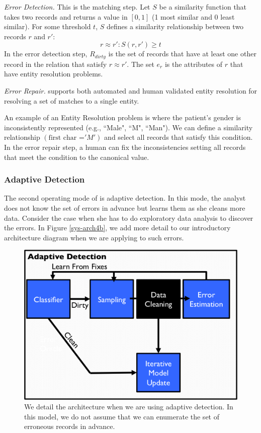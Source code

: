\vspace{0.5em}

\emph{Error Detection. } This is the matching step. Let $S$ be a similarity function that takes two records and returns a value in $[0,1]$ (1 most similar and 0 least similar). For some threshold $t$, $S$ defines a similarity relationship between two records $r$ and $r'$:
\[
r \approx r' : S(r,r') \ge t
\] 
In the error detection step, $R_{dirty}$ is the set of records that have at least one other record in the relation that satisfy $r \approx r'$.
The set $e_r$ is the attributes of $r$ that have entity resolution problems.

\vspace{0.5em}

\emph{Error Repair. } \sys supports both automated and human validated entity resolution for resolving a set of matches to a single entity.

\begin{example}
An example of an Entity Resolution problem is where the patient's gender is inconsistently represented (e.g., ``Male", ``M", ``Man"). 
We can define a similarity relationship $(\text{first char =} 'M')$ and select all records that satisfy this condition.
In the error repair step, a human can fix the inconsistencies setting all records that meet the condition to the canonical value.
\end{example}

\subsubsection{Adaptive Detection}
The second operating mode of \sys is adaptive detection.
In this mode, the analyst does not know the set of errors in advance but learns them as she cleans more data.
Consider the case when she has to do exploratory data analysis to discover the errors.
In Figure \ref{sys-arch4b}, we add more detail to our introductory architecture diagram when we are applying \sys to such errors.

\begin{figure}[t]
\centering
 \includegraphics[width=0.6\columnwidth]{figs/arch1b.png}
 \caption{We detail the \sys architecture when we are using adaptive detection. In this model, we do not assume that we can enumerate the set of erroneous records in advance. \label{sys-arch4a}}
\end{figure}


